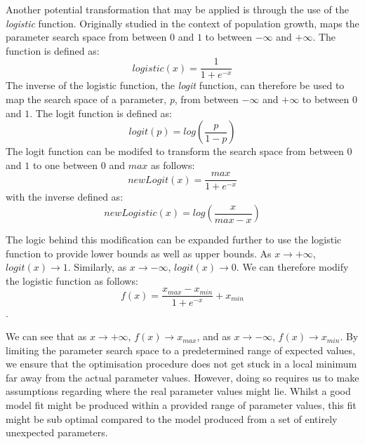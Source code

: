 Another potential transformation that may be applied is through the
use of the \emph{logistic} function. Originally studied in the context
of population growth, maps the parameter search space from between $0$ and $1$
to between $-\infty$ and $+\infty$. The function is
defined as:
\begin{equation}
logistic(x)=\frac{1}{1+e^{-x}}
\end{equation}
The inverse of the logistic function, the \emph{logit} function, can
therefore be used to map the search space of a parameter, \emph{p},
from between $-\infty$ and $+\infty$ to between $0$ and $1$. The logit
function is defined as:
\begin{equation}
logit(p) = log(\frac{p}{1-p})
\end{equation}
The logit function can be modifed to transform the search space from
between $0$ and $1$ to one between $0$ and $max$ as follows:
\begin{equation}
newLogit(x) = \frac{max}{1+e^{-x}}
\end{equation}
with the inverse defined as:
\begin{equation}
newLogistic(x)=log(\frac{x}{max-x})
\end{equation}

The logic behind this modification can be expanded further to use the
logistic function to provide lower bounds as well as upper bounds. As
$x\rightarrow +\infty$, $logit(x)\rightarrow 1$. Similarly, as
$x\rightarrow-\infty$, $logit(x)\rightarrow 0$. We can therefore modify
the logistic function as follows:
\begin{equation}
f(x) = \frac{x_{max}-x_{min}}{1+e^{-x}} + x_{min}
\end{equation}.

We can see that as $x\rightarrow +\infty$, $f(x)\rightarrow x_{max}$,
and as $x\rightarrow -\infty$, $f(x)\rightarrow x_{min}$. By limiting
the parameter search space to a predetermined range of expected
values, we ensure that the optimisation procedure does not get stuck
in a local minimum far away from the actual parameter values. However,
doing so requires us to make assumptions regarding where the real
parameter values might lie. Whilst a good model fit might be produced
within a provided range of parameter values, this fit might be sub
optimal compared to the model produced from a set of entirely
unexpected parameters. 

